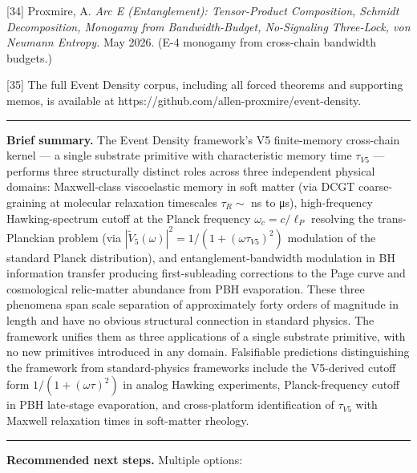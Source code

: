 \documentclass[
  11pt,
  a4paperpaper,
]{article}
\begin{document}
{[}34{]} Proxmire, A. \emph{Arc E (Entanglement): Tensor-Product
Composition, Schmidt Decomposition, Monogamy from Bandwidth-Budget,
No-Signaling Three-Lock, von Neumann Entropy.} May 2026. (E-4 monogamy
from cross-chain bandwidth budgets.)

{[}35{]} The full Event Density corpus, including all forced theorems
and supporting memos, is available at
https://github.com/allen-proxmire/event-density.

\begin{center}\rule{0.5\linewidth}{0.5pt}\end{center}

\textbf{Brief summary.} The Event Density framework's V5 finite-memory
cross-chain kernel --- a single substrate primitive with characteristic
memory time \(\tau_{V5}\) --- performs three structurally distinct roles
across three independent physical domains: Maxwell-class viscoelastic
memory in soft matter (via DCGT coarse-graining at molecular relaxation
timescales \(\tau_R \sim\) ns to μs), high-frequency Hawking-spectrum
cutoff at the Planck frequency \(\omega_c = c/\ell_P\) resolving the
trans-Planckian problem (via
\(|\tilde V_5(\omega)|^2 = 1/(1+(\omega\tau_{V5})^2)\) modulation of the
standard Planck distribution), and entanglement-bandwidth modulation in
BH information transfer producing first-subleading corrections to the
Page curve and cosmological relic-matter abundance from PBH evaporation.
These three phenomena span scale separation of approximately forty
orders of magnitude in length and have no obvious structural connection
in standard physics. The framework unifies them as three applications of
a single substrate primitive, with no new primitives introduced in any
domain. Falsifiable predictions distinguishing the framework from
standard-physics frameworks include the V5-derived cutoff form
\(1/(1+(\omega\tau)^2)\) in analog Hawking experiments, Planck-frequency
cutoff in PBH late-stage evaporation, and cross-platform identification
of \(\tau_{V5}\) with Maxwell relaxation times in soft-matter rheology.

\begin{center}\rule{0.5\linewidth}{0.5pt}\end{center}

\textbf{Recommended next steps.} Multiple options:
\end{document}
